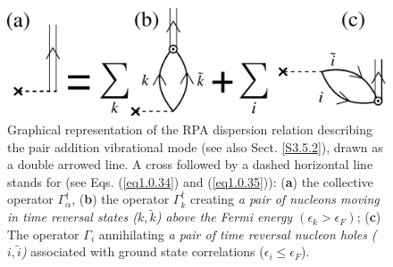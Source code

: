 \begin{figure}
	\centerline {
		\includegraphics*[width=12cm]{introduccion/figs/fig_preface_3_1}
	}
	\caption{ Graphical representation of the RPA dispersion relation describing the pair addition  vibrational mode (see also Sect. \ref{S3.5.2}), drawn as a double arrowed line.  A cross followed by a dashed horizontal line stands for (see Eqs. (\ref{eq1.0.34}) and (\ref{eq1.0.35})): (\textbf{a}) the collective operator $\Gamma_\alpha^\dagger$, (\textbf{b}) the operator $\Gamma_k^\dagger$ creating \textit{a pair of nucleons moving in time reversal  states ($k,\tilde k$) above the Fermi energy $(\epsilon_k>\epsilon_F)$}; (\textbf{c}) The operator $\Gamma_i$ annihilating \textit{a pair of time reversal nucleon holes  ($i,\tilde i$)} associated with ground state correlations ($\epsilon_i\leq\epsilon_F$).}
	\label{fig0.3.1}
\end{figure}
